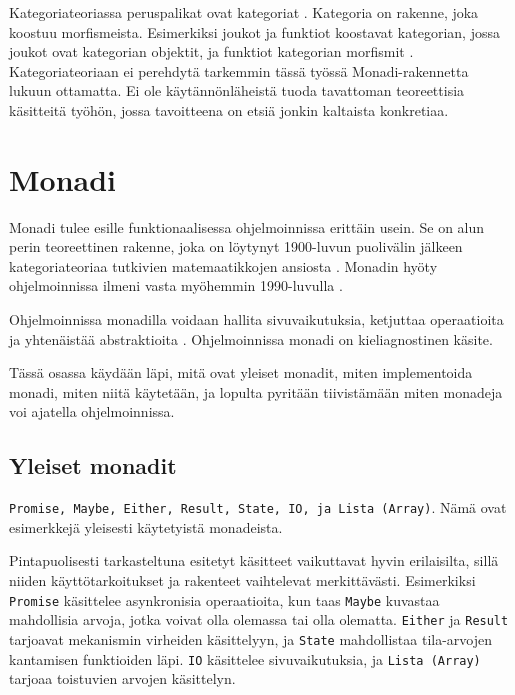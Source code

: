 Kategoriateoriassa peruspalikat ovat kategoriat \cite[9]{milewski2017category}. Kategoria on rakenne, joka koostuu morfismeista. Esimerkiksi joukot ja funktiot koostavat kategorian, jossa joukot ovat kategorian objektit, ja funktiot kategorian morfismit \cite{category_theory}. Kategoriateoriaan ei perehdytä tarkemmin tässä työssä Monadi-rakennetta lukuun ottamatta. Ei ole käytännönläheistä tuoda tavattoman teoreettisia käsitteitä työhön, jossa tavoitteena on etsiä jonkin kaltaista konkretiaa.


\section{Monadi}

Monadi tulee esille funktionaalisessa ohjelmoinnissa erittäin usein. Se on alun perin teoreettinen rakenne, joka on löytynyt 1900-luvun puolivälin jälkeen kategoriateoriaa tutkivien matemaatikkojen ansiosta \cite{Beck2003}. Monadin hyöty ohjelmoinnissa ilmeni vasta myöhemmin 1990-luvulla \cite{computerphile_monad}.

Ohjelmoinnissa monadilla voidaan hallita sivuvaikutuksia, ketjuttaa operaatioita ja yhtenäistää abstraktioita \cite{computerphile_monad,bartosz_category_for_progamers_10,stackoverflow_what_monad}. Ohjelmoinnissa monadi on kieliagnostinen käsite.

Tässä osassa käydään läpi, mitä ovat yleiset monadit, miten implementoida monadi, miten niitä käytetään, ja lopulta pyritään tiivistämään miten monadeja voi ajatella ohjelmoinnissa.

\subsection{Yleiset monadit}

\texttt{Promise, Maybe, Either, Result, State, IO, ja Lista (Array)}. Nämä ovat esimerkkejä yleisesti käytetyistä monadeista. \cite{monad_wikipedia,bartosz_category_for_progamers_10}

Pintapuolisesti tarkasteltuna esitetyt käsitteet vaikuttavat hyvin erilaisilta, sillä niiden käyttötarkoitukset ja rakenteet vaihtelevat merkittävästi. Esimerkiksi \texttt{Promise} käsittelee asynkronisia operaatioita, kun taas \texttt{Maybe} kuvastaa mahdollisia arvoja, jotka voivat olla olemassa tai olla olematta. \texttt{Either} ja \texttt{Result} tarjoavat mekanismin virheiden käsittelyyn, ja \texttt{State} mahdollistaa tila-arvojen kantamisen funktioiden läpi. \texttt{IO} käsittelee sivuvaikutuksia, ja \texttt{Lista (Array)} tarjoaa toistuvien arvojen käsittelyn.

